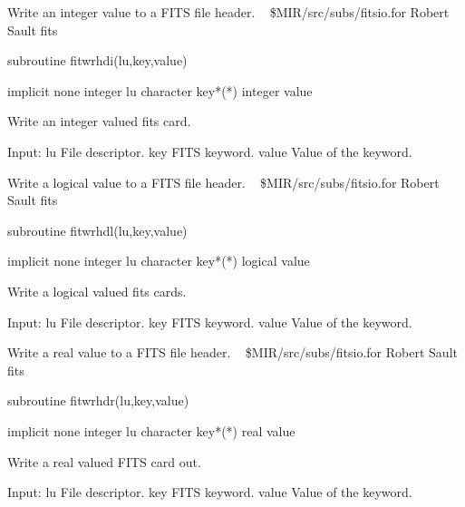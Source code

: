%
\noindent Write an integer value to a FITS file header.
\newline \ 
\newline {} \$MIR/src/subs/fitsio.for
\newline {} Robert Sault
\newline {} fits
\par{\tenpoint
{\eightpoint\begintt
        subroutine fitwrhdi(lu,key,value)

        implicit none
        integer lu
        character key*(*)
        integer value

  Write an integer valued fits card.

  Input:
    lu         File descriptor.
    key        FITS keyword.
    value      Value of the keyword.
\endtt}
\par}
%
\noindent Write a logical value to a FITS file header.
\newline \ 
\newline {} \$MIR/src/subs/fitsio.for
\newline {} Robert Sault
\newline \abox{Keywords:} fits
\par{\tenpoint
{\eightpoint\begintt
        subroutine fitwrhdl(lu,key,value)

        implicit none
        integer lu
        character key*(*)
        logical value

  Write a logical valued fits cards.

  Input:
    lu         File descriptor.
    key        FITS keyword.
    value      Value of the keyword.
\endtt}
\par}
%
\noindent Write a real value to a FITS file header.
\newline \ 
\newline {} \$MIR/src/subs/fitsio.for
\newline \abox{Responsible:} Robert Sault
\newline {} fits
\par{\tenpoint
{\eightpoint\begintt
        subroutine fitwrhdr(lu,key,value)

        implicit none
        integer lu
        character key*(*)
        real value

  Write a real valued FITS card out.

  Input:
    lu         File descriptor.
    key        FITS keyword.
    value      Value of the keyword.
\endtt}
\par}
